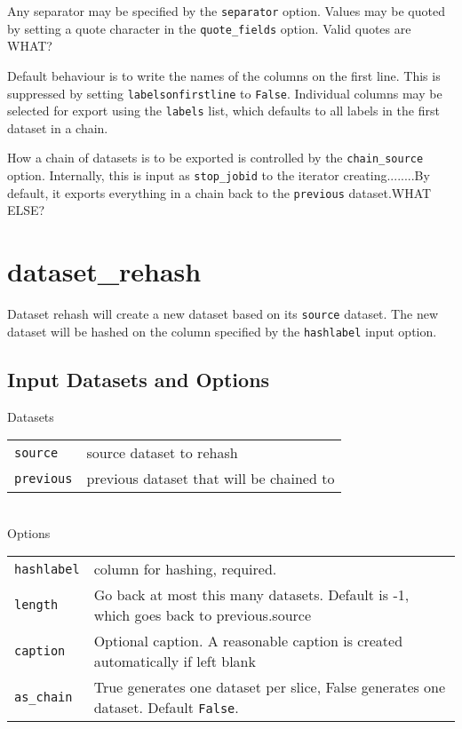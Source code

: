 Any separator may be specified by the \texttt{separator} option.
Values may be quoted by setting a quote character in the
\texttt{quote\_fields} option.  Valid quotes are WHAT?


Default behaviour is to write the names of the columns on the first
line.  This is suppressed by setting \texttt{labelsonfirstline} to
\texttt{False}.  Individual columns may be selected for export using
the \texttt{labels} list, which defaults to all labels in the first
dataset in a chain.

How a chain of datasets is to be exported is controlled by the
\texttt{chain\_source} option.  Internally, this is input as \texttt{stop\_jobid}
to the iterator creating........By default, it exports everything in a
chain back to the \texttt{previous} dataset.WHAT ELSE? 















\clearpage
\section{dataset\_rehash}

Dataset rehash will create a new dataset based on its \texttt{source}
dataset.  The new dataset will be hashed on the column specified by
the \texttt{hashlabel} input option.

\subsection{Input Datasets and Options}

Datasets\\

\begin{tabular}{ll}
  \texttt{source}   & source dataset to rehash\\
  \texttt{previous} & previous dataset that will be chained to\\
\end{tabular}\\


\noindent Options\\

\begin{tabular}{ll}
  \texttt{hashlabel} & column for hashing, required.\\
  \texttt{length}    & Go back at most this many datasets. Default is -1, which goes back to previous.source\\
  \texttt{caption}   & Optional caption.  A reasonable caption is created automatically if left blank\\
  \texttt{as\_chain}  & True generates one dataset per slice, False generates one dataset.  Default \texttt{False}.\\
\end{tabular}


